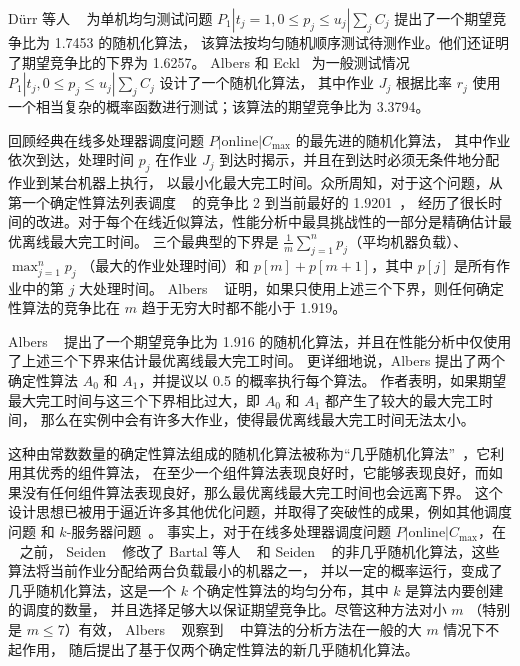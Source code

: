 Dürr 等人 ~\cite{durr2018scheduling,durr2020adversarial} 为单机均匀测试问题 \( P_1 | t_j = 1, 0 \leq p_j \leq u_j | \sum_j C_j \) 提出了一个期望竞争比为 1.7453 的随机化算法，
该算法按均匀随机顺序测试待测作业。他们还证明了期望竞争比的下界为 1.6257。
Albers 和 Eckl~\cite{albers2021explorable} 为一般测试情况 \( P_1 | t_j, 0 \leq p_j \leq u_j | \sum_j C_j \) 设计了一个随机化算法，
其中作业 \( J_j \) 根据比率 \( r_j \) 使用一个相当复杂的概率函数进行测试；该算法的期望竞争比为 3.3794。

回顾经典在线多处理器调度问题 \( P | \text{online} | C_{\text{max}} \) 的最先进的随机化算法，
其中作业依次到达，处理时间 \( p_j \) 在作业 \( J_j \) 到达时揭示，并且在到达时必须无条件地分配作业到某台机器上执行，
以最小化最大完工时间。众所周知，对于这个问题，从第一个确定性算法列表调度 ~\cite{graham1966bounds} 的竞争比 2 到当前最好的 1.9201~\cite{fleischer2000line}，
经历了很长时间的改进。对于每个在线近似算法，性能分析中最具挑战性的一部分是精确估计最优离线最大完工时间。
三个最典型的下界是 \( \frac{1}{m} \sum_{j=1}^n p_j \)（平均机器负载）、\( \max_{j=1}^n p_j \)
（最大的作业处理时间）和 \( p[m] + p[m+1] \)，其中 \( p[j] \) 是所有作业中的第 \( j \) 大处理时间。
Albers ~\cite{albers2002randomized} 证明，如果只使用上述三个下界，则任何确定性算法的竞争比在 \( m \) 趋于无穷大时都不能小于 1.919。

Albers ~\cite{albers2002randomized} 提出了一个期望竞争比为 1.916 的随机化算法，并且在性能分析中仅使用了上述三个下界来估计最优离线最大完工时间。
更详细地说，Albers 提出了两个确定性算法 \( A_0 \) 和 \( A_1 \)，并提议以 0.5 的概率执行每个算法。
作者表明，如果期望最大完工时间与这三个下界相比过大，即 \( A_0 \) 和 \( A_1 \) 都产生了较大的最大完工时间，
那么在实例中会有许多大作业，使得最优离线最大完工时间无法太小。

这种由常数数量的确定性算法组成的随机化算法被称为“几乎随机化算法”~\cite{reingold1994randomized}，它利用其优秀的组件算法，
在至少一个组件算法表现良好时，它能够表现良好，而如果没有任何组件算法表现良好，那么最优离线最大完工时间也会远离下界。
这个设计思想已被用于逼近许多其他优化问题，并取得了突破性的成果，例如其他调度问题 \cite{seiden2003barely, 9} 和 \( k \)-服务器问题~\cite{bartal2000randomized}。
事实上，对于在线多处理器调度问题 \( P | \text{online} | C_{\text{max}} \)，在 ~\cite{albers2002randomized} 之前，
Seiden ~\cite{seiden2003barely} 修改了 Bartal 等人 ~\cite{bartal1992new} 和 Seiden ~\cite{seiden2000online} 的非几乎随机化算法，这些算法将当前作业分配给两台负载最小的机器之一，
并以一定的概率运行，变成了几乎随机化算法，这是一个 \( k \) 个确定性算法的均匀分布，其中 \( k \) 是算法内要创建的调度的数量，
并且选择足够大以保证期望竞争比。尽管这种方法对小 \( m \) （特别是 \( m \leq 7 \)）有效，
Albers ~\cite{albers2002randomized} 观察到 ~\cite{bartal1992new, seiden2000online, seiden2003barely} 中算法的分析方法在一般的大 \( m \) 情况下不起作用，
随后提出了基于仅两个确定性算法的新几乎随机化算法。

